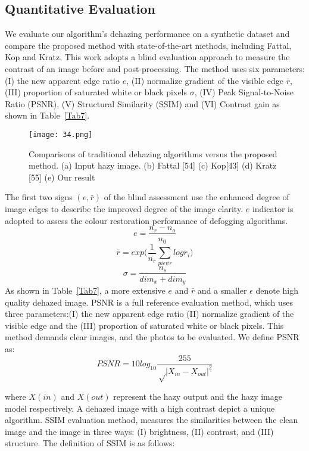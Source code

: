 \documentclass[doctor,english,listoffigures,listoftables]{thesis-uestc}
\begin{document}
\subsection{Quantitative Evaluation}
We evaluate our algorithm's dehazing performance on a synthetic dataset and compare the proposed method with state-of-the-art methods, including Fattal, Kop and Kratz. This work adopts a blind evaluation approach to measure the contrast of an image before and post-processing. The method uses six parameters: (I) the new apparent edge ratio $e$, (II) normalize gradient of the visible edge $\bar r$, (III) proportion of saturated white or black pixels $\sigma$, (IV) Peak Signal-to-Noise Ratio (PSNR), (V) Structural Similarity (SSIM) and (VI) Contrast gain as shown in Table~\ref{Tab7}.

\begin{figure*}
	\centering
	\texttt{[image: 34.png]}
	\caption{Comparisons of traditional dehazing algorithms versus the proposed method. (a) Input hazy image. (b) Fattal [54] (c) Kop[43] (d) Kratz [55] (e) Our result}
	\label{fig:19}
\end{figure*}
The first two signs $(e, \bar r )$ of the blind assessment use the enhanced degree of image edges to describe the improved degree of the image clarity.  $e$ indicator is adopted to assess the colour restoration performance of defogging algorithms. 
\begin{equation}
e=\frac{n_r-n_o}{n_0}
\end{equation}
\begin{equation}
\bar r= exp\bigg(\frac{1}{n_r}\sum_{pi\epsilon\psi r} log r_i\bigg)
\end{equation}
\begin{equation}
\sigma=\frac{n_s}{dim_x +dim_y}
\end{equation} 
As shown in Table~\ref{Tab7}, a more extensive $e$ and $\bar r $ and a smaller $\epsilon$ denote  high quality dehazed image. PSNR is a full reference evaluation method, which uses three parameters:(I) the new apparent edge ratio (II) normalize gradient of the visible edge and the (III) proportion of saturated white or black pixels. This method demands clear images, and the photos to be evaluated. We define PSNR  as:
\begin{equation}
	PSNR = 10log_{10} \frac{ 255  }{\sqrt\big| X_{in}-X_{out}\big|^2}
\end{equation}

where $X(in)$ and $X(out)$ represent the hazy output and the hazy image model respectively. A dehazed image with a high contrast depict a unique algorithm. SSIM evaluation method, measures the similarities between the clean image and the image in three ways: (I) brightness, (II) contrast, and (III) structure. The definition of SSIM is as follows:
\end{document}
